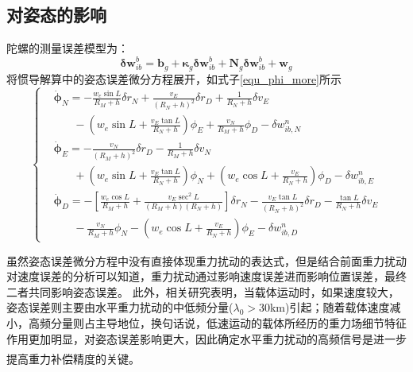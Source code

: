 \documentclass[12pt,a4,utf8]{article}
\newcommand{\upcite}[1]{\textsuperscript{\textsuperscript{\cite{#1}}}} %
\begin{document}
\subsection{对姿态的影响}
陀螺的测量误差模型为：
\begin{equation}
      \bm{\delta w}^b_{ib} = \bm{b}_g + \bm{\kappa}_g \bm{\delta w}^b_{ib} + \bm{\text{N}}_g \bm{\delta w}^b_{ib} + \bm{w}_g
      \label{gyro_bias}
\end{equation}
将惯导解算中的姿态误差微分方程展开，如式子\ref{equ_phi_more}所示
\begin{equation}
            \left\{ \begin{aligned}
            & \dot{\bm{\phi}}_N=-\frac{w_e\sin L}{R_M + h}\delta r_N+\frac{v_E}{(R_N+h)^2}\delta r_D + \frac{1}{R_N + h}\delta v_E \\
            & \ \ \ \ \ \ \ \ - \left ( w_e\sin L + \frac{v_E\tan L}{R_N +h} \right )\phi_E + \frac{v_N}{R_M+h}\phi_D - \delta w^n_{ib,N} \\ 
            & \dot{\bm{\phi}}_E= - \frac{v_N}{(R_M + h)^2}\delta r_D - \frac{1}{R_M + h }\delta v_N \\
            & \ \ \ \ \ \ \ \ + \left ( w_e \sin L + \frac{v_E\tan L}{R_N + h} \right )\phi_N + \left ( w_e \cos L +\frac{v_E}{R_N + h} \right )\phi_D - \delta w^n_{ib,E}\\ 
            & \dot{\bm{\phi}}_D= - \left [ \frac{w_e\cos L}{R_M + h}+ \frac{v_E\sec ^2L}{(R_M + h)(R_N + h)}\right ]\delta r_N - \frac{v_E \tan L}{(R_N+h)^2}\delta r_D - \frac{\tan L}{R_N + h}\delta v_E \\
            & \ \ \ \ \ \ \ \ - \frac{v_N}{R_M + h}\phi_N - \left ( w_e \cos L + \frac{v_E}{R_N + h } \right )\phi_E - \delta w^n_{ib,D}
      \end{aligned} \right.
      \label{equ_phi_more}
\end{equation}

虽然姿态误差微分方程中没有直接体现重力扰动的表达式，但是结合前面重力扰动对速度误差的分析可以知道，重力扰动通过影响速度误差进而影响位置误差，最终二者共同影响姿态误差。
此外，相关研究表明，当载体运动时，如果速度较大，姿态误差则主要由水平重力扰动的中低频分量($\lambda_0>30$km)引起；随着载体速度减小，高频分量则占主导地位，换句话说，低速运动的载体所经历的重力场细节特征作用更加明显，对姿态误差影响更大，因此确定水平重力扰动的高频信号是进一步提高重力补偿精度的关键\upcite{jekeli1994airborne,1020386196.nh}。
\end{document}
